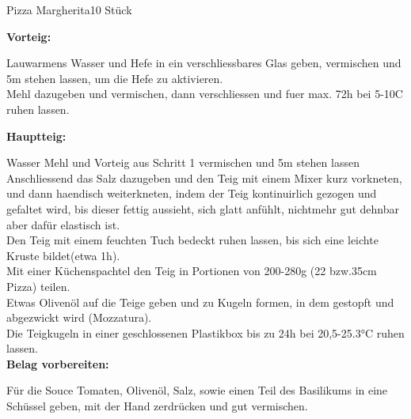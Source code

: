 \documentclass[a4paper,10pt]{article}
\newcommand{\recipeStep}[1]{\newstep\noindent\textbf{#1:}}
\begin{document}
    \begin{recipe}{Pizza Margherita}{10 Stück}

    \recipeStep{Vorteig}


    Lauwarmens Wasser und Hefe in ein verschliessbares Glas geben, vermischen und 5m stehen lassen, um die Hefe zu aktivieren.
    \\

    Mehl dazugeben und vermischen, dann verschliessen und fuer max. 72h bei 5-10\0C ruhen lassen.

    \recipeStep{Hauptteig}


    Wasser Mehl und Vorteig aus Schritt 1 vermischen und 5m stehen lassen \\

    Anschliessend das Salz dazugeben und den Teig mit einem Mixer kurz vorkneten, und dann haendisch weiterkneten, indem der Teig kontinuirlich gezogen und gefaltet wird,
    bis dieser fettig aussieht, sich glatt anfühlt, nichtmehr gut dehnbar aber dafür elastisch ist.
    \\

    Den Teig mit einem feuchten Tuch bedeckt ruhen lassen, bis sich eine leichte Kruste bildet(etwa 1h).
    \\

    Mit einer Küchenspachtel den Teig in Portionen von 200-280g (22 bzw.35cm Pizza) teilen.
    \\


    Etwas Olivenöl auf die Teige geben und zu Kugeln formen, in dem gestopft und abgezwickt wird (Mozzatura).
    \\

    Die Teigkugeln in einer geschlossenen Plastikbox bis zu 24h bei 20,5-25.3°C ruhen lassen.\\


    \recipeStep{Belag vorbereiten}




    Für die Souce Tomaten, Olivenöl, Salz, sowie einen Teil des Basilikums in eine Schüssel geben, mit der Hand zerdrücken und gut vermischen.
    \\


\end{recipe}
\end{document}
